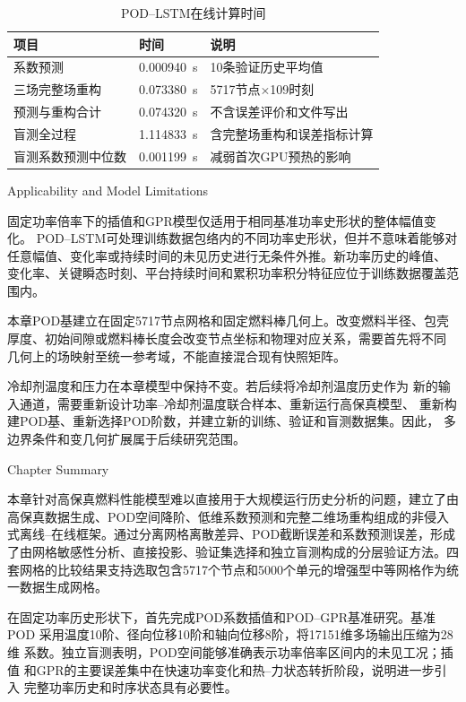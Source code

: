 \begin{table}[htbp]
	\centering
	\caption{POD--LSTM在线计算时间}
	\label{tab:formal_timing_results}
	\begin{tabularx}{\textwidth}
		{XXX}
		\toprule
		项目 & 时间 & 说明 \\
		\midrule
		系数预测 & 0.000940~s & 10条验证历史平均值 \\
		三场完整场重构 & 0.073380~s & 5717节点$\times$109时刻 \\
		预测与重构合计 & 0.074320~s & 不含误差评价和文件写出 \\
		盲测全过程 & 1.114833~s & 含完整场重构和误差指标计算 \\
		盲测系数预测中位数 & 0.001199~s & 减弱首次GPU预热的影响 \\
		\bottomrule
	\end{tabularx}
\end{table}

{Applicability and Model Limitations}

固定功率倍率下的插值和GPR模型仅适用于相同基准功率史形状的整体幅值变化。
POD--LSTM可处理训练数据包络内的不同功率史形状，但并不意味着能够对
任意幅值、变化率或持续时间的未见历史进行无条件外推。新功率历史的峰值、
变化率、关键瞬态时刻、平台持续时间和累积功率积分特征应位于训练数据覆盖范围内。

本章POD基建立在固定5717节点网格和固定燃料棒几何上。改变燃料半径、包壳
厚度、初始间隙或燃料棒长度会改变节点坐标和物理对应关系，需要首先将不同
几何上的场映射至统一参考域，不能直接混合现有快照矩阵。

冷却剂温度和压力在本章模型中保持不变。若后续将冷却剂温度历史作为
新的输入通道，需要重新设计功率--冷却剂温度联合样本、重新运行高保真模型、
重新构建POD基、重新选择POD阶数，并建立新的训练、验证和盲测数据集。因此，
多边界条件和变几何扩展属于后续研究范围。

{Chapter Summary}

本章针对高保真燃料性能模型难以直接用于大规模运行历史分析的问题，建立了由高保真数据生成、POD空间降阶、低维系数预测和完整二维场重构组成的非侵入式离线--在线框架。通过分离网格离散差异、POD截断误差和系数预测误差，形成了由网格敏感性分析、直接投影、验证集选择和独立盲测构成的分层验证方法。四套网格的比较结果支持选取包含5717个节点和5000个单元的增强型中等网格作为统一数据生成网格。

在固定功率历史形状下，首先完成POD系数插值和POD--GPR基准研究。基准POD
采用温度10阶、径向位移10阶和轴向位移8阶，将17151维多场输出压缩为28维
系数。独立盲测表明，POD空间能够准确表示功率倍率区间内的未见工况；插值
和GPR的主要误差集中在快速功率变化和热--力状态转折阶段，说明进一步引入
完整功率历史和时序状态具有必要性。

